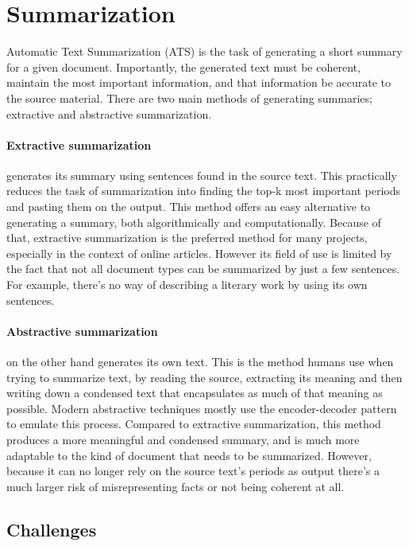 \documentclass{article}
\begin{document}
	
	\section{Summarization}
	
	Automatic Text Summarization (ATS) is the task of generating a short summary for a given document. Importantly, the generated text must be coherent, maintain the most important information, and that information be accurate to the source material. There are two main methods of generating summaries; extractive and abstractive summarization. \par
	
	\paragraph{Extractive summarization} generates its summary using sentences found in the source text. This practically reduces the task of summarization into finding the top-k most important periods and pasting them on the output. This method offers an easy alternative to generating a summary, both algorithmically and computationally. Because of that, extractive summarization is the preferred method for many projects, especially in the context of online articles. However its field of use is limited by the fact that not all document types can be summarized by just a few sentences. For example, there's no way of describing a literary work by using its own sentences.
	
	\paragraph{Abstractive summarization} on the other hand generates its own text. This is the method humans use when trying to summarize text, by reading the source, extracting its meaning and then writing down a condensed text that encapsulates as much of that meaning as possible. Modern abstractive techniques mostly use the encoder-decoder pattern to emulate this process. Compared to extractive summarization, this method produces a more meaningful and condensed summary, and is much more adaptable to the kind of document that needs to be summarized. However, because it can no longer rely on the source text's periods as output there's a much larger risk of misrepresenting facts or not being coherent at all.
	
	
	\subsection{Challenges}
	
\end{document}
